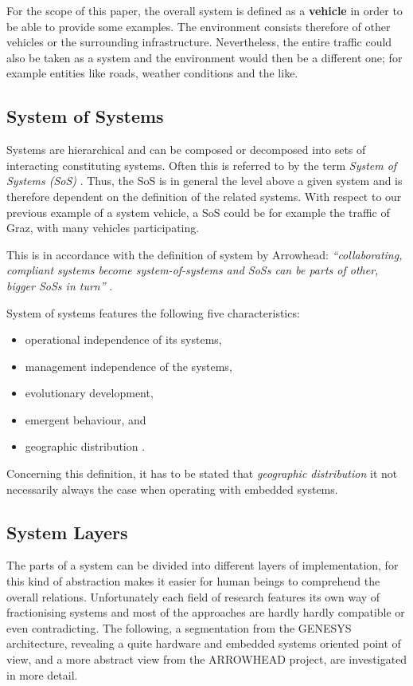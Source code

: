 For the scope of this paper, the overall system is defined as a \textbf{vehicle} in order to be able to provide some examples. The environment consists therefore of other vehicles or the surrounding infrastructure. Nevertheless, the entire traffic could also be taken as a system and the environment would then be a different one; for example entities like roads, weather conditions and the like.

\subsection{System of Systems}
Systems are hierarchical and can be composed or decomposed into sets of interacting constituting systems. Often this is referred to by the term \emph{System of Systems (SoS)} \cite[p.7]{genesys}. Thus, the SoS is in general the level above a given system and is therefore dependent on the definition of the related systems. With respect to our previous example of a system vehicle, a SoS could be for example the traffic of Graz, with many vehicles participating.

This is in accordance with the definition of system by Arrowhead: \emph{``collaborating, compliant systems become system-of-systems and SoSs can be parts of other, bigger SoSs in turn''} \cite{arrowhead_inpr}. 

System of systems features the following five characteristics:
\begin{itemize}
\item operational independence of its systems,
\item management independence of the systems,
\item evolutionary development,
\item emergent behaviour, and
\item geographic distribution \cite{arrowhead_inpr}.
\end{itemize}
Concerning this definition, it has to be stated that \emph{geographic distribution} it not necessarily always the case when operating with embedded systems.


\subsection{System Layers}
\label{ch:system_layers}
The parts of a system can be divided into different layers of implementation, for this kind of abstraction makes it easier for human beings to comprehend the overall relations. Unfortunately each field of research features its own way of fractionising systems and most of the approaches are hardly hardly compatible or even contradicting. The following, a segmentation from the GENESYS architecture, revealing a quite hardware and embedded systems oriented point of view, and a more abstract view from the ARROWHEAD project, are investigated in more detail.

